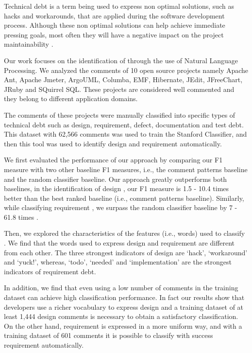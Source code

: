 Technical debt is a term being used to express non optimal solutions, such as hacks and workarounds, that are applied during the software development process. Although these non optimal solutions can help achieve immediate pressing goals, most often they will have a negative impact on the project maintainability . 

Our work focuses on the identification of \SATD through the use of Natural Language Processing. We analyzed the comments of 10 open source projects namely Apache Ant, Apache Jmeter, ArgoUML, Columba, EMF, Hibernate, JEdit, JFreeChart, JRuby and SQuirrel SQL. These projects are considered well commented and they belong to different application domains.

The comments of these projects were manually classified into specific types of technical debt such as design, requirement, defect, documentation and test debt. This dataset with 62,566 comments was used to train the Stanford Classifier, and then this tool was used to identify  design and requirement \SATD automatically.

We first evaluated the performance of our approach by comparing our F1 measure with two other baseline F1 measures, i.e., the comment patterns baseline and the random classifier baseline. Our approach greatly outperforms both baselines, in the identification of design \SATD, our F1 measure is 1.5 - 10.4  times better than the best ranked baseline (i.e., comment patterns baseline). Similarly, while classifying requirement \SATD, we surpass the random classifier baseline by 7 - 61.8 times  .

Then, we explored the characteristics of the features (i.e., words) used to classify \SATD. We find that the words used to express design and requirement \SATD are different from each other. The three strongest indicators of design \SATD are `hack', `workaround' and `yuck!', whereas, `todo', `needed' and `implementation' are the strongest indicators of requirement debt.
 
In addition, we find that even using a low number of \SATD comments in the training dataset can achieve high classification performance. In fact our results show that developers use a richer vocabulary to express design \SATD and a training dataset of at least 1,444  design \SATD comments is necessary to obtain a satisfactory classification. On the other hand, requirement \SATD is expressed in a more uniform way, and with a training dataset of 601  \SATD comments it is possible to classify with success requirement \SATD automatically.

